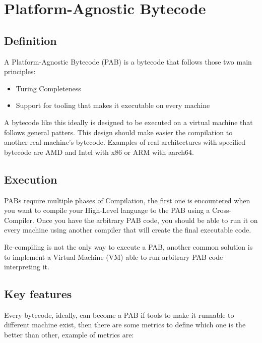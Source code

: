 \documentclass[../main.tex]{subfiles}
\begin{document}
\section{Platform-Agnostic Bytecode}
\subsection{Definition}

A Platform-Agnostic Bytecode (PAB) is a bytecode that follows those two main principles:

\begin{itemize}
    \item Turing Completeness
    \item Support for tooling that makes it executable on every machine
\end{itemize}

A bytecode like this ideally is designed to be executed on a virtual machine that follows general patters. This design should make easier the compilation to another real machine's bytecode. Examples of real architectures with specified bytecode are AMD and Intel with x86 or ARM with aarch64. %

\subsection{Execution}

PABs require multiple phases of Compilation, the first one is encountered when you want to compile your High-Level language to the PAB using a Cross-Compiler. Once you have the arbitrary PAB code, you should be able to run it on every machine using another compiler that will create the final executable code.

Re-compiling is not the only way to execute a PAB, another common solution is to implement a Virtual Machine (VM) able to run arbitrary PAB code interpreting it.

\subsection{Key features}

Every bytecode, ideally, can become a PAB if tools to make it runnable to different machine exist, then there are some metrics to define which one is the better than other, example of metrics are:
\end{document}
